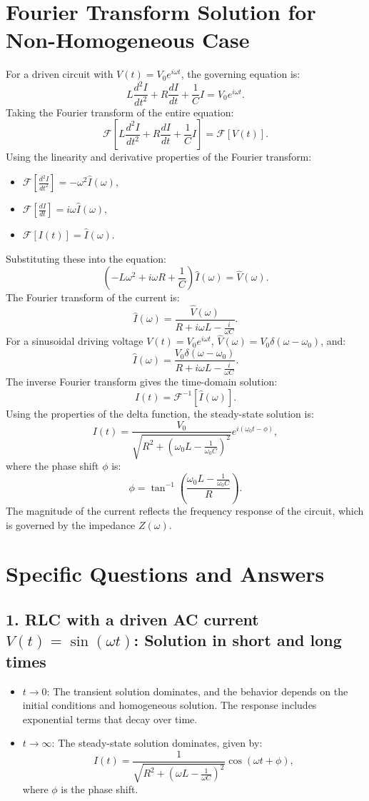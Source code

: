 \documentclass[a4paper,11pt]{article}
\begin{document}
\section*{Fourier Transform Solution for Non-Homogeneous Case}
For a driven circuit with \(V(t) = V_0 e^{i\omega t}\), the governing equation is:
\[
L \frac{d^2I}{dt^2} + R \frac{dI}{dt} + \frac{1}{C} I = V_0 e^{i\omega t}.
\]
Taking the Fourier transform of the entire equation:
\[
\mathcal{F}\left[L \frac{d^2I}{dt^2} + R \frac{dI}{dt} + \frac{1}{C} I \right] = \mathcal{F}[V(t)].
\]
Using the linearity and derivative properties of the Fourier transform:
\begin{itemize}
    \item \(\mathcal{F}\left[\frac{d^2I}{dt^2}\right] = -\omega^2 \hat{I}(\omega),\)
    \item \(\mathcal{F}\left[\frac{dI}{dt}\right] = i\omega \hat{I}(\omega),\)
    \item \(\mathcal{F}[I(t)] = \hat{I}(\omega).\)
\end{itemize}
Substituting these into the equation:
\[
\left(-L\omega^2 + i\omega R + \frac{1}{C}\right) \hat{I}(\omega) = \hat{V}(\omega).
\]
The Fourier transform of the current is:
\[
\hat{I}(\omega) = \frac{\hat{V}(\omega)}{R + i\omega L - \frac{i}{\omega C}}.
\]
For a sinusoidal driving voltage \(V(t) = V_0 e^{i\omega t}\), \(\hat{V}(\omega) = V_0 \delta(\omega - \omega_0)\), and:
\[
\hat{I}(\omega) = \frac{V_0 \delta(\omega - \omega_0)}{R + i\omega L - \frac{i}{\omega C}}.
\]
The inverse Fourier transform gives the time-domain solution:
\[
I(t) = \mathcal{F}^{-1}[\hat{I}(\omega)].
\]
Using the properties of the delta function, the steady-state solution is:
\[
I(t) = \frac{V_0}{\sqrt{R^2 + \left(\omega_0 L - \frac{1}{\omega_0 C}\right)^2}} e^{i(\omega_0 t - \phi)},
\]
where the phase shift \(\phi\) is:
\[
\phi = \tan^{-1}\left(\frac{\omega_0 L - \frac{1}{\omega_0 C}}{R}\right).
\]
The magnitude of the current reflects the frequency response of the circuit, which is governed by the impedance \(Z(\omega)\).

\section*{Specific Questions and Answers}
\subsection*{1. RLC with a driven AC current \(V(t) = \sin(\omega t)\): Solution in short and long times}
\begin{itemize}
    \item \(t \to 0\): The transient solution dominates, and the behavior depends on the initial conditions and homogeneous solution. The response includes exponential terms that decay over time.
    \item \(t \to \infty\): The steady-state solution dominates, given by:
    \[
    I(t) = \frac{1}{\sqrt{R^2 + \left(\omega L - \frac{1}{\omega C}\right)^2}} \cos(\omega t + \phi),
    \]
    where \(\phi\) is the phase shift.
\end{itemize}
\end{document}
